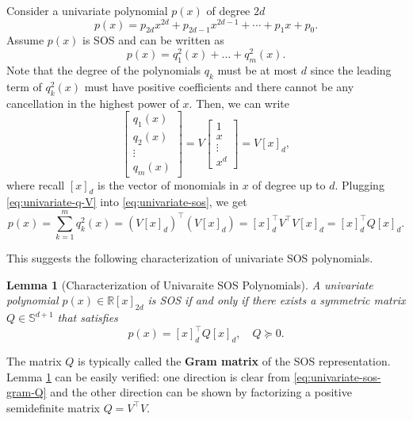 \documentclass[
]{book}
\newtheorem{lemma}{Lemma}[chapter]
\theoremstyle{definition}
\theoremstyle{definition}
\theoremstyle{definition}
\theoremstyle{definition}
\theoremstyle{remark}
\begin{document}
Consider a univariate polynomial \(p(x)\) of degree \(2d\)
\[
p(x) = p_{2d} x^{2d} + p_{2d-1} x^{2d-1} + \cdots + p_1 x + p_0.
\]
Assume \(p(x)\) is SOS and can be written as
\begin{equation}
p(x) = q_1^2(x) + \dots + q_m^2(x).
\label{eq:univariate-sos}
\end{equation}
Note that the degree of the polynomials \(q_k\) must be at most \(d\) since the leading term of \(q_k^2(x)\) must have positive coefficients and there cannot be any cancellation in the highest power of \(x\). Then, we can write
\begin{equation}
\begin{bmatrix} q_1(x) \\ q_2(x) \\ \vdots \\ q_m(x) \end{bmatrix} = V \begin{bmatrix} 1 \\ x \\ \vdots \\ x^d \end{bmatrix} = V [x]_d,
\label{eq:univariate-q-V}
\end{equation}
where recall \([x]_d\) is the vector of monomials in \(x\) of degree up to \(d\). Plugging \eqref{eq:univariate-q-V} into \eqref{eq:univariate-sos}, we get
\begin{equation}
p(x) = \sum_{k=1}^m q_k^2 (x) = (V [x]_d)^\top(V [x]_d) = [x]_d^\top V^\top V [x]_d = [x]_d^\top Q [x]_d.
\label{eq:univariate-sos-gram-Q}
\end{equation}

This suggests the following characterization of univariate SOS polynomials.

\begin{lemma}[Characterization of Univaraite SOS Polynomials]
\protect\hypertarget{lem:UnivaraiteSOS}{}\label{lem:UnivaraiteSOS}A univariate polynomial \(p(x) \in \mathbb{R}[x]_{2d}\) is SOS if and only if there exists a symmetric matrix \(Q \in \mathbb{S}^{d+1}\) that satisfies
\[
p(x) = [x]_d^\top Q [x]_d, \quad Q \succeq 0.
\]
\end{lemma}

The matrix \(Q\) is typically called the \textbf{Gram matrix} of the SOS representation. Lemma \ref{lem:UnivaraiteSOS} can be easily verified: one direction is clear from \eqref{eq:univariate-sos-gram-Q} and the other direction can be shown by factorizing a positive semidefinite matrix \(Q = V^\top V\).
\end{document}
